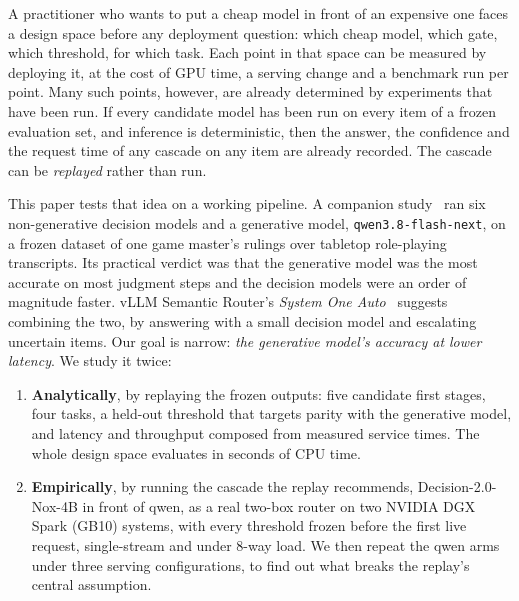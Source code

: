 \documentclass[11pt]{article}
\begin{document}
A practitioner who wants to put a cheap model in front of an expensive one faces a design space
before any deployment question: which cheap model, which gate, which threshold, for which task.
Each point in that space can be measured by deploying it, at the cost of GPU time, a serving
change and a benchmark run per point. Many such points, however, are already determined by
experiments that have been run. If every candidate model has been run on every item of a frozen
evaluation set, and inference is deterministic, then the answer, the confidence and the request time
of any cascade on any item are already recorded. The cascade can be \emph{replayed} rather than run.

This paper tests that idea on a working pipeline. A companion study~\cite{companion} ran six
non-generative decision models and a generative model, \texttt{qwen3.8-flash-next}, on a frozen
dataset of one game master's rulings over tabletop role-playing transcripts. Its practical verdict was
that the generative model was the most accurate on most judgment steps and the decision models were
an order of magnitude faster. vLLM Semantic Router's \emph{System One Auto}~\cite{sysoneauto}
suggests combining the two, by answering with a small decision model and escalating uncertain items.
Our goal is narrow: \emph{the generative model's accuracy at lower latency}. We study it twice:
\begin{enumerate}
  \item \textbf{Analytically}, by replaying the frozen outputs: five candidate first stages, four
        tasks, a held-out threshold that targets parity with the generative model, and latency and
        throughput composed from measured service times. The whole design space evaluates in seconds
        of CPU time.
  \item \textbf{Empirically}, by running the cascade the replay recommends, Decision-2.0-Nox-4B in
        front of qwen, as a real two-box router on two NVIDIA DGX Spark (GB10) systems, with every
        threshold frozen before the first live request, single-stream and under 8-way load. We then
        repeat the qwen arms under three serving configurations, to find out what breaks the
        replay's central assumption.
\end{enumerate}
\end{document}
